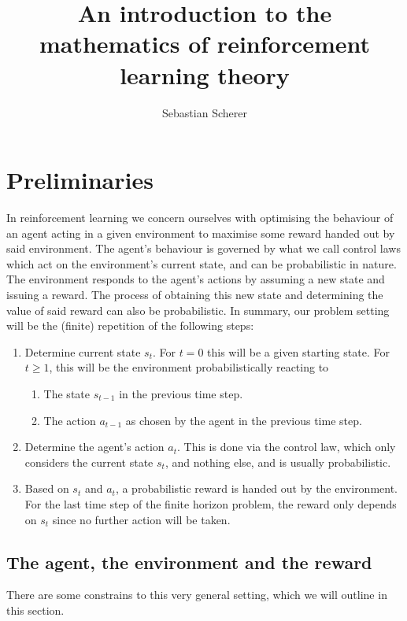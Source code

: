 \documentclass[11pt]{article} %
\title{An introduction to the mathematics of reinforcement learning theory}
\author{Sebastian Scherer}
\begin{document}
\maketitle

\section{Preliminaries}

In reinforcement learning we concern ourselves with optimising the behaviour of an agent acting in a given environment to maximise some reward handed out by said environment. The agent's behaviour is governed by what we call control laws which act on the environment's current state, and can be probabilistic in nature. The environment responds to the agent's actions by assuming a new state and issuing a reward. The process of obtaining this new state and determining the value of said reward can also be probabilistic. In summary, our problem setting will be the (finite) repetition of the following steps:

\begin{enumerate}
	\item Determine current state $s_t$. For $t=0$ this will be a given starting state. For $t \ge 1$, this will be the environment probabilistically reacting to
	\begin{enumerate}
		\item The state $s_{t-1}$ in the previous time step.
		\item The action $a_{t-1}$ as chosen by the agent in the previous time step.
	\end{enumerate}
	\item Determine the agent's action $a_t$. This is done via the control law, which only considers the current state $s_t$, and nothing else, and is usually probabilistic.
	\item Based on $s_t$ and $a_t$, a probabilistic reward is handed out by the environment. For the last time step of the finite horizon problem, the reward only depends on $s_t$ since no further action will be taken.
\end{enumerate}

\subsection{The agent, the environment and the reward}\label{agentEnvironmentReward}

There are some constrains to this very general setting, which we will outline in this section. 
\end{document}
